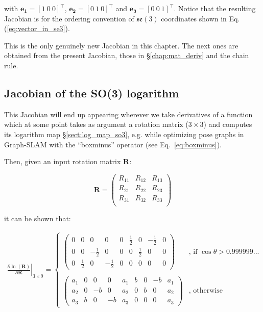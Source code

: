 \documentclass[a4paper,11pt]{report}
\begin{document}
\noindent with $\mathbf{e_1}=[1 ~ 0 ~ 0]^\top$,
$\mathbf{e_2}=[0 ~ 1 ~ 0]^\top$ and
$\mathbf{e_3}=[0 ~ 0 ~ 1]^\top$.
Notice that the resulting Jacobian is for the
ordering convention of $\mathfrak{se}(3)$ coordinates shown in Eq.(\ref{eq:vector_in_se3}).

This is the only genuinely new Jacobian in this chapter.
The next ones are obtained from the present Jacobian,
those in \S\ref{chap:mat_deriv} and the chain rule.


\subsection{Jacobian of the SO(3) logarithm}
\label{sect:eq:jacob_dLnROT_dROT}

This Jacobian will end up appearing wherever we take derivatives of a function which at some point takes
as argument a rotation matrix ($3\times 3$) and computes its logarithm map \S\ref{sect:log_map_so3},
e.g. while optimizing pose graphs in Graph-SLAM with the 
``boxminus'' operator (see Eq.~\ref{eq:boxminus}).

Then, given an input rotation matrix $\mathbf{R}$:

\begin{equation}
\mathbf{R} = \left(
\begin{array}{ccc}
 R_{11} & R_{12} & R_{13} \\
 R_{21} & R_{22} & R_{23} \\
 R_{31} & R_{32} & R_{33} \\
\end{array}
\right)
\nonumber
\end{equation}

\noindent it can be shown that:

\begin{eqnarray}
\left.
 \frac{\partial \ln(\mathbf{R}) }{\partial \mathbf{R}}
\right|_{3\times 9}
 =
\left\{
\begin{array}{ll}
  \left(
  \begin{array}{ccc|ccc|ccc}
   0  & 0 &  0  & 0 & 0 & \frac{1}{2} & 0 & -\frac{1}{2} & 0   \\
   0  & 0 &  -\frac{1}{2}  & 0 & 0 & 0 & \frac{1}{2} & 0 & 0   \\
   0  & \frac{1}{2} &  0 & -\frac{1}{2} & 0 & 0 & 0 & 0 & 0
  \end{array}
  \right)
 &
\text{, if $\cos\theta > 0.999999...$} \\
~\\
  \left(
  \begin{array}{ccc|ccc|ccc}
   a_1  & 0 &  0  & 0 & a_1 & b & 0 & -b & a_1   \\
   a_2  & 0 & -b  & 0 & a_2 & 0 & b & 0 & a_2   \\
   a_3  & b &  0 & -b & a_3 & 0 & 0 & 0 & a_3
  \end{array}
  \right)
 &
\text{, otherwise}
\end{array}
\right.
\end{eqnarray}
\end{document}

